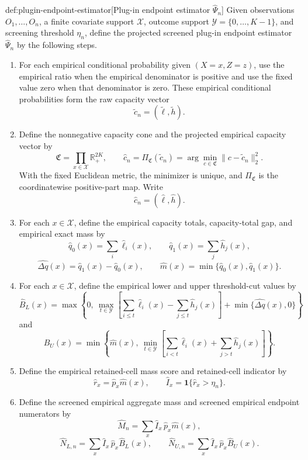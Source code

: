 \begin{algorithmv}{def:plugin-endpoint-estimator}[Plug-in endpoint estimator \(\widehat\Psi_n\)]
Given observations \(O_1,\ldots,O_n\), a finite covariate support \(\mathcal X\), outcome support \(\mathcal Y=\{0,\ldots,K-1\}\), and screening threshold \(\eta_n\), define the projected screened plug-in endpoint estimator \(\widehat\Psi_n\) by the following steps.
\begin{enumerate}
\item For each empirical conditional probability given \((X=x,Z=z)\), use the empirical ratio when the empirical denominator is positive and use the fixed value zero when that denominator is zero. These empirical conditional probabilities form the raw capacity vector
\[
\widetilde c_n=(\widetilde\ell,\widetilde h).
\]

\item Define the nonnegative capacity cone and the projected empirical capacity vector by
\[
\mathfrak C=\prod_{x\in\mathcal X}\mathbb R_+^{2K},
\qquad
\widehat c_n
=\Pi_{\mathfrak C}(\widetilde c_n)
=\arg\min_{c\in\mathfrak C}\|c-\widetilde c_n\|_2^2.
\]
With the fixed Euclidean metric, the minimizer is unique, and \(\Pi_{\mathfrak C}\) is the coordinatewise positive-part map. Write
\[
\widehat c_n=(\widehat\ell,\widehat h).
\]

\item For each \(x\in\mathcal X\), define the empirical capacity totals, capacity-total gap, and empirical exact mass by
\[
\widehat q_0(x)=\sum_i\widehat\ell_i(x),
\qquad
\widehat q_1(x)=\sum_j\widehat h_j(x),
\]
\[
\widehat{\Delta q}(x)=\widehat q_1(x)-\widehat q_0(x),
\qquad
\widehat m(x)=\min\{\widehat q_0(x),\widehat q_1(x)\}.
\]

\item For each \(x\in\mathcal X\), define the empirical lower and upper threshold-cut values by
\[
\widehat B_L(x)=
\max\left\{
0,\ 
\max_{t\in\mathcal Y}
\left[
\sum_{i\le t}\widehat\ell_i(x)
-
\sum_{j\le t}\widehat h_j(x)
\right]
+
\min\{\widehat{\Delta q}(x),0\}
\right\}
\]
and
\[
\widehat B_U(x)=
\min\left\{
\widehat m(x),\ 
\min_{t\in\mathcal Y}
\left[
\sum_{i<t}\widehat\ell_i(x)
+
\sum_{j>t}\widehat h_j(x)
\right]
\right\}.
\]

\item Define the empirical retained-cell mass score and retained-cell indicator by
\[
\widehat r_x=\widehat p_x\widehat m(x),
\qquad
\widehat I_x=\mathbf 1\{\widehat r_x>\eta_n\}.
\]

\item Define the screened empirical aggregate mass and screened empirical endpoint numerators by
\[
\widehat M_n=\sum_x \widehat I_x\,\widehat p_x\widehat m(x),
\]
\[
\widehat N_{L,n}=\sum_x \widehat I_x\,\widehat p_x\widehat B_L(x),
\qquad
\widehat N_{U,n}=\sum_x \widehat I_x\,\widehat p_x\widehat B_U(x).
\]


\end{enumerate}
\end{algorithmv}

